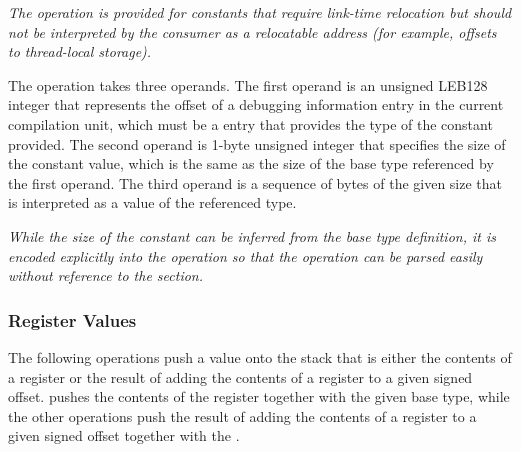 \begin{enumerate}[1. ]
\textit{The \DWOPconstxNAME{} operation is provided for constants that
require link-time relocation but should not be
interpreted by the consumer as a relocatable address
(for example, offsets to thread-local storage).}

\itembfnl{\DWOPconsttypeTARG}
The \DWOPconsttypeNAME{} operation takes three operands. The first operand 
is an unsigned LEB128 integer that represents the offset of a debugging
information entry in the current compilation unit, which must be a
\DWTAGbasetype{} entry that provides the type of the constant provided. The
second operand is 1-byte unsigned integer that specifies the size of the
constant value, which is the same as the size of the base type referenced
by the first operand. The third operand is a 
\bb
sequence of bytes of the given size that is 
\eb
interpreted as a value of the referenced type.

\textit{While the size of the constant can be inferred from the base type
definition, it is encoded explicitly into the operation so that the
operation can be parsed easily without reference to the \dotdebuginfo{}
section.}

\end{enumerate}

\subsubsection{Register Values}
\label{chap:registervalues}
The following operations push a value onto the stack that is either the
contents of a register or the result of adding the contents of a register
to a given signed offset. 
\DWOPregvaltype{} pushes the contents
of the register together with the given base type, while the other operations
push the result of adding the contents of a register to a given
signed offset together with the \specialaddresstype.

